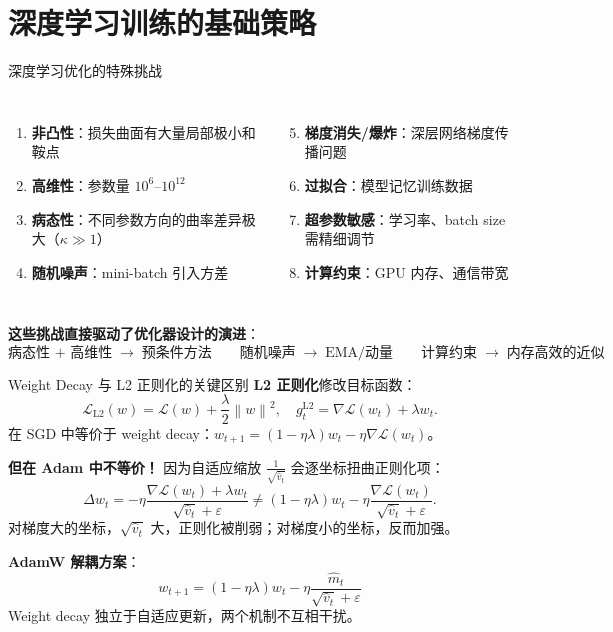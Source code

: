 \documentclass[aspectratio=169,10pt]{ctexbeamer}
\newcommand{\eps}{\varepsilon}
\newcommand{\grad}{\nabla}
\newcommand{\norm}[1]{\left\lVert #1 \right\rVert}
\begin{document}
\section{深度学习训练的基础策略}

\begin{frame}{深度学习优化的特殊挑战}
\begin{columns}[T]
\begin{enumerate}
  \item \textbf{非凸性}：损失曲面有大量局部极小和鞍点
  \item \textbf{高维性}：参数量 $10^6$--$10^{12}$
  \item \textbf{病态性}：不同参数方向的曲率差异极大（$\kappa\gg1$）
  \item \textbf{随机噪声}：mini-batch 引入方差
\end{enumerate}

\begin{enumerate}
  \setcounter{enumi}{4}
  \item \textbf{梯度消失/爆炸}：深层网络梯度传播问题
  \item \textbf{过拟合}：模型记忆训练数据
  \item \textbf{超参数敏感}：学习率、batch size 需精细调节
  \item \textbf{计算约束}：GPU 内存、通信带宽
\end{enumerate}
\end{columns}

\vspace{0.3cm}
\textbf{这些挑战直接驱动了优化器设计的演进}：
\[
  \text{病态性 + 高维性} \;\to\; \text{预条件方法}\qquad
  \text{随机噪声} \;\to\; \text{EMA/动量}\qquad
  \text{计算约束} \;\to\; \text{内存高效的近似}
\]
\end{frame}

\begin{frame}{Weight Decay 与 L2 正则化的关键区别}
\textbf{L2 正则化}修改目标函数：
\[
  \mathcal{L}_{\text{L2}}(w) = \mathcal{L}(w) + \frac{\lambda}{2}\norm{w}^2,\quad
  g_t^{\text{L2}} = \grad\mathcal{L}(w_t) + \lambda w_t.
\]
在 SGD 中等价于 weight decay：$w_{t+1} = (1-\eta\lambda)w_t - \eta\grad\mathcal{L}(w_t)$。

\vspace{0.2cm}
\textbf{但在 Adam 中不等价！} 因为自适应缩放 $\frac{1}{\sqrt{\hat v_t}}$ 会逐坐标扭曲正则化项：
\[
  \Delta w_t = -\eta\frac{\grad\mathcal{L}(w_t) + \lambda w_t}{\sqrt{\hat v_t}+\eps}
  \neq (1-\eta\lambda)w_t - \eta\frac{\grad\mathcal{L}(w_t)}{\sqrt{\hat v_t}+\eps}.
\]
对梯度大的坐标，$\sqrt{\hat v_t}$ 大，正则化被削弱；对梯度小的坐标，反而加强。

\vspace{0.2cm}
\textbf{AdamW 解耦方案}：
\[
  \boxed{w_{t+1} = (1-\eta\lambda)w_t - \eta\frac{\hat m_t}{\sqrt{\hat v_t}+\eps}}
\]
Weight decay 独立于自适应更新，两个机制不互相干扰。
\end{frame}
\end{document}
